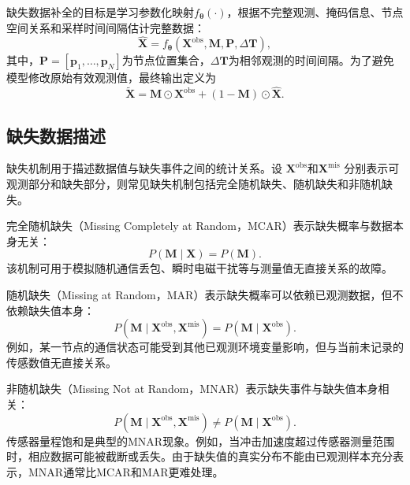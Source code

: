 缺失数据补全的目标是学习参数化映射$f_{\boldsymbol{\theta}}(\cdot)$，根据不完整观测、掩码信息、节点空间关系和采样时间间隔估计完整数据：
\begin{equation}
    \widehat{\boldsymbol{X}}
    =
    f_{\boldsymbol{\theta}}
    \left(
    \boldsymbol{X}^{\mathrm{obs}},
    \boldsymbol{M},
    \boldsymbol{P},
    \Delta\boldsymbol{T}
    \right),
\end{equation}
其中，$\boldsymbol{P}=[\boldsymbol{p}_1,\ldots,\boldsymbol{p}_N]$为节点位置集合，$\Delta\boldsymbol{T}$为相邻观测的时间间隔。为了避免模型修改原始有效观测值，最终输出定义为
\begin{equation}
    \widetilde{\boldsymbol{X}}
    =
    \boldsymbol{M}\odot\boldsymbol{X}^{\mathrm{obs}}
    +(1-\boldsymbol{M})\odot\widehat{\boldsymbol{X}}.
\end{equation}

\subsection{缺失数据描述}

缺失机制用于描述数据值与缺失事件之间的统计关系。设
$\boldsymbol{X}^{\mathrm{obs}}$和$\boldsymbol{X}^{\mathrm{mis}}$
分别表示可观测部分和缺失部分，则常见缺失机制包括完全随机缺失、随机缺失和非随机缺失。

完全随机缺失（Missing Completely at Random，MCAR）表示缺失概率与数据本身无关：
\begin{equation}
    P(\boldsymbol{M}\mid\boldsymbol{X})
    =
    P(\boldsymbol{M}).
\end{equation}
该机制可用于模拟随机通信丢包、瞬时电磁干扰等与测量值无直接关系的故障。

随机缺失（Missing at Random，MAR）表示缺失概率可以依赖已观测数据，但不依赖缺失值本身：
\begin{equation}
    P(\boldsymbol{M}\mid
    \boldsymbol{X}^{\mathrm{obs}},
    \boldsymbol{X}^{\mathrm{mis}})
    =
    P(\boldsymbol{M}\mid\boldsymbol{X}^{\mathrm{obs}}).
\end{equation}
例如，某一节点的通信状态可能受到其他已观测环境变量影响，但与当前未记录的传感数值无直接关系。

非随机缺失（Missing Not at Random，MNAR）表示缺失事件与缺失值本身相关：
\begin{equation}
    P(\boldsymbol{M}\mid
    \boldsymbol{X}^{\mathrm{obs}},
    \boldsymbol{X}^{\mathrm{mis}})
    \neq
    P(\boldsymbol{M}\mid\boldsymbol{X}^{\mathrm{obs}}).
\end{equation}
传感器量程饱和是典型的MNAR现象。例如，当冲击加速度超过传感器测量范围时，相应数据可能被截断或丢失。由于缺失值的真实分布不能由已观测样本充分表示，MNAR通常比MCAR和MAR更难处理。

